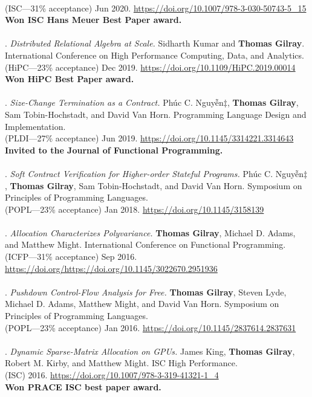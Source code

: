 \\(ISC---31\% acceptance) Jun 2020. \url{https://doi.org/10.1007/978-3-030-50743-5_15}
\\\textbf{Won ISC Hans Meuer Best Paper award.} \\ \vspace{-0.1cm}\\
\paper. \textit{Distributed Relational Algebra at Scale.}
Sidharth Kumar and \textbf{Thomas Gilray}.
International Conference on High Performance Computing, Data, and Analytics.
\\(HiPC---23\% acceptance) Dec 2019. \url{https://doi.org/10.1109/HiPC.2019.00014}
\\\textbf{Won HiPC Best Paper award.} \\ \vspace{-0.1cm}\\
\paper. \textit{Size-Change Termination as a Contract.}
Phúc C. Nguyễn$\ddagger$, \textbf{Thomas Gilray}, Sam Tobin-Hochstadt, and David Van Horn.
Programming Language Design and Implementation.
\\(PLDI---27\% acceptance) Jun 2019. \url{https://doi.org/10.1145/3314221.3314643}
\\\textbf{Invited to the Journal of Functional Programming.} \\ \vspace{-0.1cm}\\
\paper. \textit{Soft Contract Verification for Higher-order Stateful Programs.}
Phúc C. Nguyễn$\ddagger$, \textbf{Thomas Gilray}, Sam Tobin-Hochstadt, and David Van Horn.
Symposium on Principles of Programming Languages.
\\(POPL---23\% acceptance) Jan 2018. \url{https://doi.org/10.1145/3158139}
\\ \vspace{-0.1cm}\\
\paper. \textit{Allocation Characterizes Polyvariance.}
\textbf{Thomas Gilray}, Michael D. Adams, and Matthew Might.
International Conference on Functional Programming.
\\(ICFP---31\% acceptance) Sep 2016. \url{https://doi.org/https://doi.org/10.1145/3022670.2951936}
\\ \vspace{-0.1cm}\\
\paper. \textit{Pushdown Control-Flow Analysis for Free.}
\textbf{Thomas Gilray}, Steven Lyde, Michael D. Adams, Matthew Might, and David Van Horn.
Symposium on Principles of Programming Languages.
\\(POPL---23\% acceptance) Jan 2016. \url{https://doi.org/10.1145/2837614.2837631}
\\ \vspace{-0.1cm}\\
\paper. \textit{Dynamic Sparse-Matrix Allocation on GPUs.}
James King, \textbf{Thomas Gilray}, Robert M. Kirby, and Matthew Might.
ISC High Performance.
\\(ISC) 2016. \url{https://doi.org/10.1007/978-3-319-41321-1_4}
\\\textbf{Won PRACE ISC best paper award.} \\ \vspace{-0.1cm}\\
